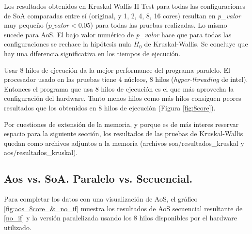 \documentclass{article}
\begin{document}
Los resultados obtenidos en Kruskal-Wallis H-Test para todas las configuraciones de SoA comparadas entre sí
(original, y 1, 2, 4, 8, 16 cores) resultan en \textit{p\_valor} muy pequeño (${p\_valor} < 0.05$) para todas
las pruebas realizadas. Lo mismo sucede para AoS. El bajo valor numérico de \textit{p\_valor} hace que para todas las configuraciones se rechace
la hipótesis nula ${H_0}$ de Kruskal-Wallis. Se concluye que hay una diferencia significativa
en los tiempos de ejecución.

Usar 8 hilos de ejecución da la mejor performance del programa paralelo. El procesador
usado en las pruebas tiene 4 núcleos, 8 hilos (\textit{hyper-threading} de intel).
Entonces el programa que usa 8 hilos de ejecución es el que más aprovecha la configuración del hardware.
Tanto menos hilos como más hilos consiguen peores resultados que los obtenidos en 8 hilos de ejecución (Figura \ref{fig:8core}).

Por cuestiones de extensión de la memoria, y porque es de más interes reservar espacio
para la siguiente sección, los resultados de las pruebas de Kruskal-Wallis quedan como archivos adjuntos a la memoria (archivos soa/resultados\_kruskal
y aos/resultados\_kruskal).

\subsection{Aos vs. SoA. Paralelo vs. Secuencial.\label{t-test}}
Para completar los datos con una visualización de AoS, el gráfico \ref{fig:aos_8core_&_no_if} muestra los resultados
de AoS secuencial resultante de \ref{no_if} y la versión paralelizada usando los 8 hilos disponibles
por el hardware utilizado.
\end{document}
